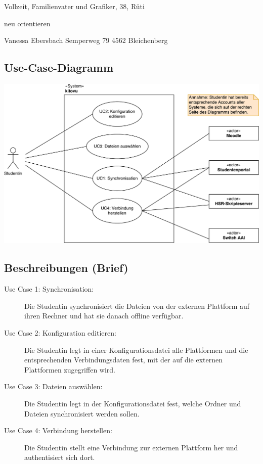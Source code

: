 \documentclass[a4paper]{article}
\begin{document}
Vollzeit, Familienvater und Grafiker, 38, Rüti

neu orientieren





Vanessa Ebersbach
Semperweg 79
4562 Bleichenberg


\subsection{Use-Case-Diagramm}


\includegraphics[width=40em]{./img/uc_diagram_kitovu.pdf}

\subsection{Beschreibungen (Brief)}
\begin{description}
	
\item[Use Case 1: Synchronisation:] Die Studentin synchronisiert die Dateien von der externen Plattform auf ihren Rechner und hat sie danach offline verfügbar.
	
\item[Use Case 2: Konfiguration editieren:] Die Studentin legt in einer Konfigurationsdatei alle Plattformen und die entsprechenden Verbindungsdaten fest, mit der auf die externen Plattformen zugegriffen wird.

\item[Use Case 3: Dateien auswählen:] Die Studentin legt in der Konfigurationsdatei fest, welche Ordner und Dateien synchronisiert werden sollen.

\item[Use Case 4: Verbindung herstellen:] Die Studentin stellt eine Verbindung zur externen Plattform her und authentisiert sich dort.


\end{description}
\end{document}
